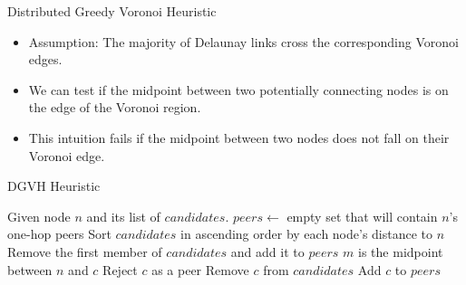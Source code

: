 \documentclass[11pt]{beamer}
\begin{document}
\begin{frame}{Distributed Greedy Voronoi Heuristic}
	
	\begin{itemize}
		\item Assumption: The majority of Delaunay links cross the corresponding Voronoi edges.
		\item We can test if the midpoint between two potentially connecting nodes is on the edge of the Voronoi region.
		\item This intuition fails if the midpoint between two nodes does not fall on their Voronoi edge.
	\end{itemize}
	
\end{frame}

\begin{frame}{DGVH Heuristic}
	
	\begin{algorithmic}[1]  %
		\STATE Given node $n$ and its list of $candidates$.
		\STATE $peers \leftarrow$ empty set that will contain $n$'s one-hop peers
		\STATE Sort $candidates$ in ascending order by each node's distance to $n$
		\STATE Remove the first member of $candidates$ and add it to $peers$
		\STATE $m$ is the midpoint between $n$ and $c$
		\STATE Reject $c$ as a peer
		\ELSE
		\STATE Remove $c$ from $candidates$
		\STATE Add $c$ to $peers$
		\ENDIF
		\ENDFOR
	\end{algorithmic}
	
\end{frame}



\end{document}
